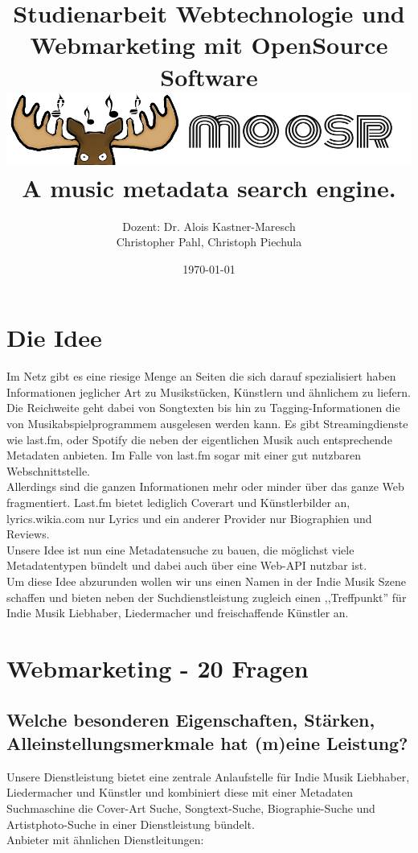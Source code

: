 \documentclass[11pt]{scrreprt}
\title{Studienarbeit Webtechnologie und Webmarketing mit OpenSource Software \\
    \includegraphics[scale=0.5]{./elchlogo.png} \\
    \normalsize{A music metadata search engine.}
}
\author{Dozent: Dr. Alois Kastner-Maresch\\
Christopher Pahl, Christoph Piechula}
\date{\today}
\begin{document}
\maketitle
\tableofcontents


\chapter{Die Idee}
Im Netz gibt es eine riesige Menge an Seiten die sich darauf spezialisiert
haben Informationen jeglicher Art zu Musikstücken, Künstlern und ähnlichem zu
liefern.
\\
Die Reichweite geht dabei von Songtexten bis hin zu Tagging-Informationen die von
Musikabspielprogrammem ausgelesen werden kann. Es gibt Streamingdienste wie last.fm,
oder Spotify die neben der eigentlichen Musik auch entsprechende Metadaten anbieten. 
Im Falle von last.fm sogar mit einer gut nutzbaren Webschnittstelle.
\\
Allerdings sind die ganzen Informationen mehr oder minder über das ganze Web
fragmentiert. Last.fm bietet lediglich Coverart und Künstlerbilder an, 
lyrics.wikia.com nur Lyrics und ein anderer Provider nur Biographien und
Reviews.
\\
Unsere Idee ist nun eine Metadatensuche zu bauen, die möglichst viele
Metadatentypen bündelt und dabei auch über eine Web-API nutzbar ist.
\\
Um diese Idee abzurunden wollen wir uns einen Namen in der Indie Musik Szene
schaffen und bieten neben der Suchdienstleistung zugleich einen ,,Treffpunkt'' für Indie
Musik Liebhaber, Liedermacher und freischaffende Künstler an.


\chapter{Webmarketing - 20 Fragen}
\label{wettbewerb}\section{Welche besonderen Eigenschaften, Stärken,
Alleinstellungsmerkmale hat (m)eine Leistung?}

Unsere Dienstleistung bietet eine zentrale Anlaufstelle für Indie Musik
Liebhaber, Liedermacher und Künstler und kombiniert diese mit einer Metadaten Suchmaschine
die Cover-Art Suche, Songtext-Suche, Biographie-Suche und Artistphoto-Suche in
einer Dienstleistung bündelt.
\\
Anbieter mit ähnlichen Dienstleitungen: \\
\end{document}
